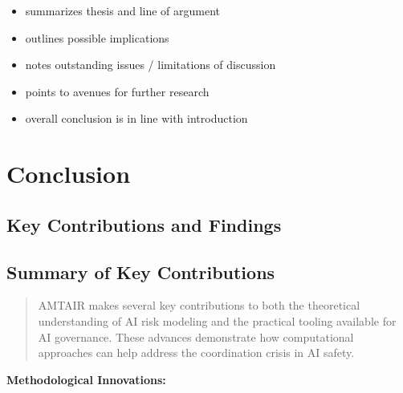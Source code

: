 \documentclass[
  11pt,
  letterpaper,
]{book}
\begin{document}
\begin{tcolorbox}[enhanced jigsaw, colbacktitle=quarto-callout-note-color!10!white, toprule=.15mm, coltitle=black, opacityback=0, colback=white, bottomtitle=1mm, title=\textcolor{quarto-callout-note-color}{\faInfo}\hspace{0.5em}{10\% of Grade: \textasciitilde{} 14\% of text \textasciitilde{} 4200
words \textasciitilde{} 10 pages}, rightrule=.15mm, bottomrule=.15mm, breakable, arc=.35mm, toptitle=1mm, leftrule=.75mm, titlerule=0mm, left=2mm, opacitybacktitle=0.6, colframe=quarto-callout-note-color-frame]

\begin{itemize}
\item
  summarizes thesis and line of argument
\item
  outlines possible implications
\item
  notes outstanding issues / limitations of discussion
\item
  points to avenues for further research
\item
  overall conclusion is in line with introduction
\end{itemize}

\end{tcolorbox}


\chapter{Conclusion}\label{sec-conclusion}

\section{Key Contributions and Findings}\label{sec-key-contributions}

\section{Summary of Key Contributions}\label{sec-key-contributions2}

\begin{quote}
AMTAIR makes several key contributions to both the theoretical
understanding of AI risk modeling and the practical tooling available
for AI governance. These advances demonstrate how computational
approaches can help address the coordination crisis in AI safety.
\end{quote}

\textbf{Methodological Innovations:}
\end{document}
